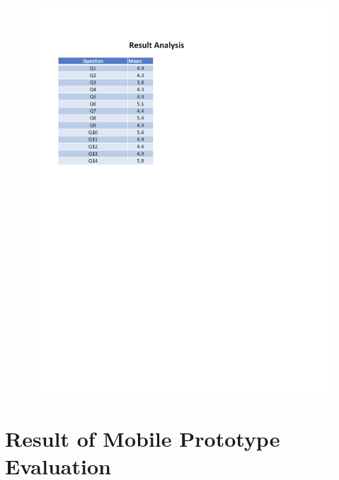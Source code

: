 \begin{appendices}
\begin{figure}[h!t]
    \centering
      \includegraphics[width=6in]{ch5/Result/Desktop/3.pdf}
  \label{fig:Result:Analysis:Desktop}
\end{figure}

\clearpage
\newpage
\section{Result of Mobile Prototype Evaluation}
\label{sec:ResultforMobilePrototype}


\end{appendices}
